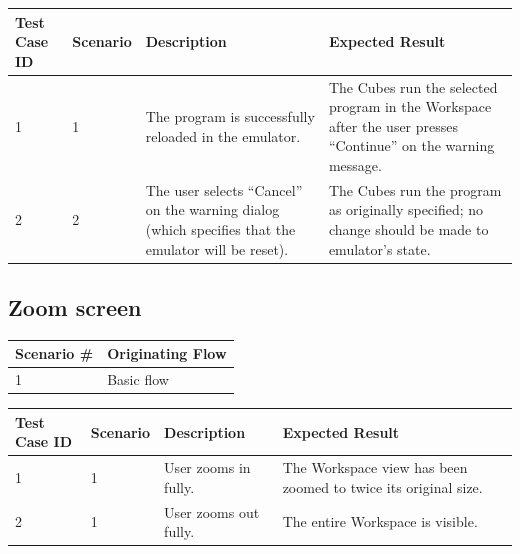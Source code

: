 \documentclass[12pt]{article}
\begin{document}
\begin{table}[h!]
  \begin{tabular}{p{.5in} | p{.75in} | p{2.15in} | p{2.15in}}
    \textbf{Test Case ID} &
    \textbf{Scenario} &
    \textbf{Description} &
    \textbf{Expected Result} \\ \hline

    1 &
    1 &
    The program is successfully reloaded in the emulator. &
    The Cubes run the selected program in the Workspace after the user presses ``Continue'' on the warning message. \\ \hline

    2 &
    2 &
    The user selects ``Cancel'' on the warning dialog (which specifies that the emulator will be reset). &
    The Cubes run the program as originally specified; no change should be made to emulator's state. \\ \hline

  \end{tabular}
\end{table}

\subsection{Zoom screen}

\begin{table}[h!]
  \begin{tabular}{l | l}
    \textbf{Scenario \#} &
    \textbf{Originating Flow} \\ \hline

    1 &
    Basic flow \\ \hline

  \end{tabular}
\end{table}

\begin{table}[h!]
  \begin{tabular}{p{.5in} | p{.75in} | p{2.15in} | p{2.15in}}
    \textbf{Test Case ID} &
    \textbf{Scenario} &
    \textbf{Description} &
    \textbf{Expected Result} \\ \hline

    1 &
    1 &
    User zooms in fully. &
    The Workspace view has been zoomed to twice its original size. \\ \hline

    2 &
    1 &
    User zooms out fully. &
    The entire Workspace is visible. \\ \hline

  \end{tabular}
\end{table}
\end{document}
